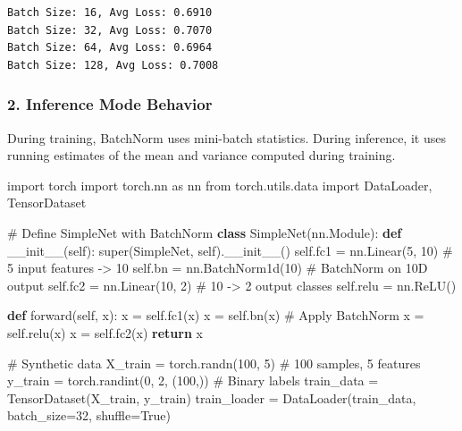 \documentclass[
  letterpaper,
  DIV=11,
  numbers=noendperiod]{scrreprt}
\newenvironment{Shaded}{\begin{snugshade}}{\end{snugshade}}
\newcommand{\BuiltInTok}[1]{\textcolor[rgb]{0.00,0.23,0.31}{#1}}
\newcommand{\CommentTok}[1]{\textcolor[rgb]{0.37,0.37,0.37}{#1}}
\newcommand{\ControlFlowTok}[1]{\textcolor[rgb]{0.00,0.23,0.31}{\textbf{#1}}}
\newcommand{\DecValTok}[1]{\textcolor[rgb]{0.68,0.00,0.00}{#1}}
\newcommand{\FunctionTok}[1]{\textcolor[rgb]{0.28,0.35,0.67}{#1}}
\newcommand{\ImportTok}[1]{\textcolor[rgb]{0.00,0.46,0.62}{#1}}
\newcommand{\KeywordTok}[1]{\textcolor[rgb]{0.00,0.23,0.31}{\textbf{#1}}}
\newcommand{\NormalTok}[1]{\textcolor[rgb]{0.00,0.23,0.31}{#1}}
\newcommand{\OperatorTok}[1]{\textcolor[rgb]{0.37,0.37,0.37}{#1}}
\newcommand{\VariableTok}[1]{\textcolor[rgb]{0.07,0.07,0.07}{#1}}
\begin{document}
\begin{verbatim}
Batch Size: 16, Avg Loss: 0.6910
Batch Size: 32, Avg Loss: 0.7070
Batch Size: 64, Avg Loss: 0.6964
Batch Size: 128, Avg Loss: 0.7008
\end{verbatim}

\subsubsection{2. Inference Mode
Behavior}\label{inference-mode-behavior}

During training, BatchNorm uses mini-batch statistics. During inference,
it uses running estimates of the mean and variance computed during
training.

\begin{Shaded}
\begin{Highlighting}[]
\ImportTok{import}\NormalTok{ torch}
\ImportTok{import}\NormalTok{ torch.nn }\ImportTok{as}\NormalTok{ nn}
\ImportTok{from}\NormalTok{ torch.utils.data }\ImportTok{import}\NormalTok{ DataLoader, TensorDataset}

\CommentTok{\# Define SimpleNet with BatchNorm}
\KeywordTok{class}\NormalTok{ SimpleNet(nn.Module):}
    \KeywordTok{def} \FunctionTok{\_\_init\_\_}\NormalTok{(}\VariableTok{self}\NormalTok{):}
        \BuiltInTok{super}\NormalTok{(SimpleNet, }\VariableTok{self}\NormalTok{).}\FunctionTok{\_\_init\_\_}\NormalTok{()}
        \VariableTok{self}\NormalTok{.fc1 }\OperatorTok{=}\NormalTok{ nn.Linear(}\DecValTok{5}\NormalTok{, }\DecValTok{10}\NormalTok{)  }\CommentTok{\# 5 input features {-}\textgreater{} 10}
        \VariableTok{self}\NormalTok{.bn }\OperatorTok{=}\NormalTok{ nn.BatchNorm1d(}\DecValTok{10}\NormalTok{)  }\CommentTok{\# BatchNorm on 10D output}
        \VariableTok{self}\NormalTok{.fc2 }\OperatorTok{=}\NormalTok{ nn.Linear(}\DecValTok{10}\NormalTok{, }\DecValTok{2}\NormalTok{)  }\CommentTok{\# 10 {-}\textgreater{} 2 output classes}
        \VariableTok{self}\NormalTok{.relu }\OperatorTok{=}\NormalTok{ nn.ReLU()}

    \KeywordTok{def}\NormalTok{ forward(}\VariableTok{self}\NormalTok{, x):}
\NormalTok{        x }\OperatorTok{=} \VariableTok{self}\NormalTok{.fc1(x)}
\NormalTok{        x }\OperatorTok{=} \VariableTok{self}\NormalTok{.bn(x)  }\CommentTok{\# Apply BatchNorm}
\NormalTok{        x }\OperatorTok{=} \VariableTok{self}\NormalTok{.relu(x)}
\NormalTok{        x }\OperatorTok{=} \VariableTok{self}\NormalTok{.fc2(x)}
        \ControlFlowTok{return}\NormalTok{ x}

\CommentTok{\# Synthetic data}
\NormalTok{X\_train }\OperatorTok{=}\NormalTok{ torch.randn(}\DecValTok{100}\NormalTok{, }\DecValTok{5}\NormalTok{)  }\CommentTok{\# 100 samples, 5 features}
\NormalTok{y\_train }\OperatorTok{=}\NormalTok{ torch.randint(}\DecValTok{0}\NormalTok{, }\DecValTok{2}\NormalTok{, (}\DecValTok{100}\NormalTok{,))  }\CommentTok{\# Binary labels}
\NormalTok{train\_data }\OperatorTok{=}\NormalTok{ TensorDataset(X\_train, y\_train)}
\NormalTok{train\_loader }\OperatorTok{=}\NormalTok{ DataLoader(train\_data, batch\_size}\OperatorTok{=}\DecValTok{32}\NormalTok{, shuffle}\OperatorTok{=}\VariableTok{True}\NormalTok{)}


\end{Highlighting}
\end{Shaded}
\end{document}

